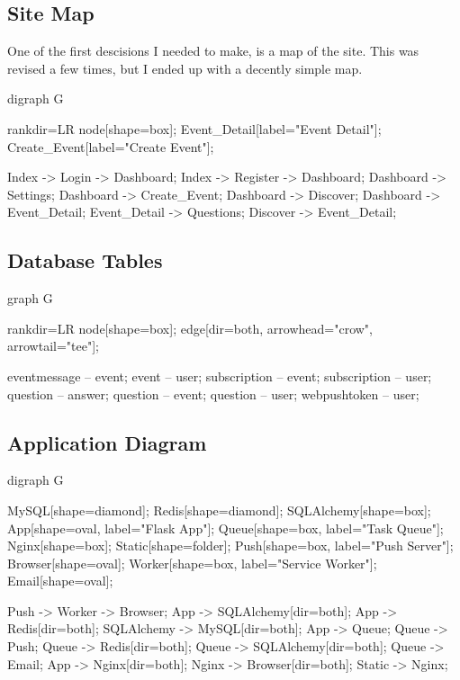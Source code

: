 \documentclass[a4paper,oneside,12pt,draft]{report}
\begin{document}
	\subsection{Site Map}
	One of the first descisions I needed to make, is a map of the site. This was revised a few times, but I ended up with a decently simple map.

	\begin{center}
		\begin{dot2tex}
			digraph G {
			rankdir=LR
			node[shape=box];
			Event_Detail[label="Event Detail"];
			Create_Event[label="Create Event"];


			Index -> Login -> Dashboard;
			Index -> Register -> Dashboard;
			Dashboard -> Settings;
			Dashboard -> Create_Event;
			Dashboard -> Discover;
			Dashboard -> Event_Detail;
			Event_Detail -> Questions;
			Discover -> Event_Detail;
			}
		\end{dot2tex}
	\end{center}

	\subsection{Database Tables}
	\begin{center}
		\begin{dot2tex}[neato]
			graph G {
			rankdir=LR
			node[shape=box];
			edge[dir=both, arrowhead="crow", arrowtail="tee"];

			eventmessage -- event;
			event -- user;
			subscription -- event;
			subscription -- user;
			question -- answer;
			question -- event;
			question -- user;
			webpushtoken -- user;
			}
		\end{dot2tex}
	\end{center}

	\subsection{Application Diagram}
	\begin{center}
		\begin{dot2tex}
			digraph G {
			MySQL[shape=diamond];
			Redis[shape=diamond];
			SQLAlchemy[shape=box];
			App[shape=oval, label="Flask App"];
			Queue[shape=box, label="Task Queue"];
			Nginx[shape=box];
			Static[shape=folder];
			Push[shape=box, label="Push Server"];
			Browser[shape=oval];
			Worker[shape=box, label="Service Worker"];
			Email[shape=oval];

			Push -> Worker -> Browser;
			App -> SQLAlchemy[dir=both];
			App -> Redis[dir=both];
			SQLAlchemy -> MySQL[dir=both];
			App -> Queue;
			Queue -> Push;
			Queue -> Redis[dir=both];
			Queue -> SQLAlchemy[dir=both];
			Queue -> Email;
			App -> Nginx[dir=both];
			Nginx -> Browser[dir=both];
			Static -> Nginx;

			}
		\end{dot2tex}
	\end{center}
\end{document}
